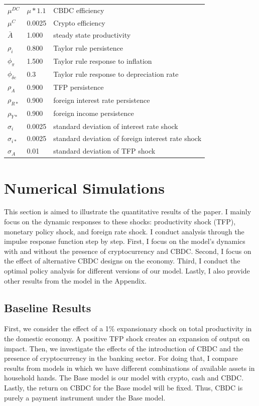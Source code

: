 \documentclass[12pt, a4paper]{article}
\begin{document}
\begin{table}[H]
\begin{tabular}{lll}
$\mu^{DC}$ 	 & 	 $\mu*1.1$ & 	CBDC efficiency\\
$\mu^{C}$ 	 & 	 0.0025 & 	Crypto efficiency\\
$\bar{A}$ 	 & 	 1.000 	 & 	 steady state productivity\\
$\rho_{i}$ 	 & 	 0.800 	 & 	 Taylor rule persistence\\
$\phi_{\pi}$ 	 & 	 1.500 	 & 	 Taylor rule response to inflation\\
$\phi_{\delta e}$ 	 & 	 0.3 	 & 	 Taylor rule response to depreciation rate\\
$\rho_{A}$ 	 & 	 0.900 	 & 	 TFP persistence\\
$\rho_{R*}$ 	 & 	 0.900 	 & 	 foreign interest rate persistence\\
$\rho_{Y*}$ 	 & 	 0.900 	 & 	 foreign income persistence\\
$\sigma_{i}$ 	 & 	 0.0025 	 & 	 standard deviation of interest rate shock\\
$\sigma_{i*}$ 	 & 	 0.0025 	 & 	 standard deviation of foreign interest rate shock\\
$\sigma_{A}$ 	 & 	 0.01 	 & 	 standard deviation of TFP shock\\

 \hline
\end{tabular}
\end{table}
\section{Numerical Simulations}
This section is aimed to illustrate the quantitative results of the paper. I mainly focus on the dynamic responses to these shocks: productivity shock (TFP), monetary policy shock, and foreign rate shock. I conduct analysis through the impulse response function step by step. First, I focus on the model's dynamics with and without the presence of cryptocurrency and CBDC. Second, I focus on the effect of alternative CBDC designs on the economy. Third, I conduct the optimal policy analysis for different versions of our model. Lastly, I also provide other results from the model in the Appendix.
\subsection{Baseline Results}

First, we consider the effect of a 1\% expansionary shock on total productivity in the domestic economy. A positive TFP shock creates an expansion of output on impact. Then, we investigate the effects of the introduction of CBDC and the presence of cryptocurrency in the banking sector. For doing that, I compare results from models in which we have different combinations of available assets in household hands. The Base model is our model with crypto, cash and CBDC. Lastly, the return on CBDC for the Base model will be fixed. Thus, CBDC is purely a payment instrument under the Base model. 
\end{document}

